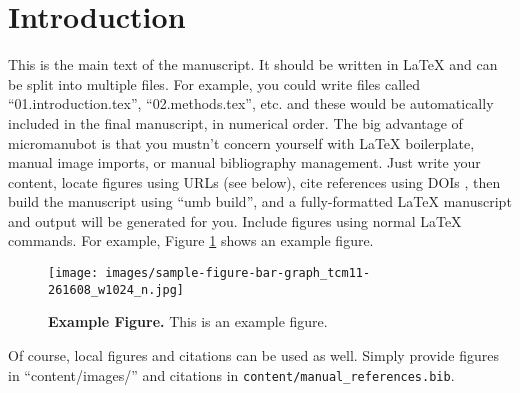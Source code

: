 \section{Introduction}

This is the main text of the manuscript.
It should be written in LaTeX and can be split into multiple files.
For example, you could write files called ``01.introduction.tex'', ``02.methods.tex'', etc. and these would be automatically included in the final manuscript, in numerical order.
The big advantage of micromanubot is that you mustn't concern yourself with LaTeX boilerplate, manual image imports, or manual bibliography management.
Just write your content, locate figures using URLs (see below), cite references using DOIs \cite{doi:10.1103/PhysRev.47.777}, then build the manuscript using ``umb build'', and a fully-formatted LaTeX manuscript and output will be generated for you.
Include figures using normal LaTeX commands.
For example, Figure \ref{fig:example} shows an example figure.

\begin{figure}[H]
    \centering
    \texttt{[image: images/sample-figure-bar-graph\_tcm11-261608\_w1024\_n.jpg]}
    \caption{
        \textbf{Example Figure.} 
        This is an example figure.
    }
    \label{fig:example}
\end{figure}

Of course, local figures and citations can be used as well.
Simply provide figures in ``content/images/'' and citations \cite{umb} in \texttt{content/manual\_references.bib}.
